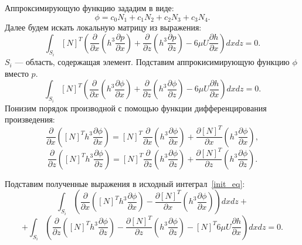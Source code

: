 \documentclass[a4paper,14pt]{extarticle}
\begin{document}
\noindent
Аппроксимирующую функцию зададим в виде:
\begin{equation*}
	\phi = c_0 N_1 + c_1 N_2 + c_2 N_3 + c_3 N_4.
\end{equation*}
\noindent
Далее будем искать локальную матрицу из выражения:
\begin{equation}
	\label{init_eq}
	\int_{S_i} {[N]^T \left(\frac{\partial}{\partial x} \left(h^3 \frac{\partial p}{\partial x} \right) + \frac{\partial}{\partial z} \left(h^3 \frac{\partial p}{\partial z} \right) - 6 \mu U \frac{\partial h}{\partial x}\right) dx dz} = 0.
\end{equation}
$S_i$ --- область, содержащая элемент. 
Подставим аппрокисимирующую функцию $\phi$ вместо $p$.
\begin{equation*}
	\int_{S_i} {[N]^T \left(\frac{\partial}{\partial x} \left(h^3 \frac{\partial \phi}{\partial x} \right) + \frac{\partial}{\partial z} \left(h^3 \frac{\partial \phi}{\partial z} \right) - 6 \mu U \frac{\partial h}{\partial x}\right) dx dz} = 0.
\end{equation*}
Понизим порядок производной с помощью функции дифференцирования произведения:
\begin{equation*}
	 \frac{\partial}{\partial x} \left( [N]^T h^3 \frac{\partial \phi}{\partial x} \right)  = [N]^T \frac{\partial}{\partial x} \left(h^3 \frac{\partial \phi}{\partial x} \right) + \frac{\partial[N]^T}{\partial x} \left(h^3 \frac{\partial \phi}{\partial x} \right),
\end{equation*}
\begin{equation*}
	 \frac{\partial}{\partial z} \left( [N]^T h^3 \frac{\partial \phi}{\partial z} \right)  = [N]^T \frac{\partial}{\partial z} \left(h^3 \frac{\partial \phi}{\partial z} \right) + \frac{\partial[N]^T}{\partial z} \left(h^3 \frac{\partial \phi}{\partial z} \right).
\end{equation*}

Подставим полученные выражения в исходный интеграл~\eqref{init_eq}:
\begin{equation*}
\int_{S_i} {\left(\frac{\partial}{\partial x} \left( [N]^T h^3 \frac{\partial \phi}{\partial x} \right) - \frac{\partial[N]^T}{\partial x} \left(h^3 \frac{\partial \phi}{\partial x} \right) \right) dxdz} + 
\end{equation*}
\begin{equation*}
 + \int_{S_i} {\left(\frac{\partial}{\partial z} \left( [N]^T h^3 \frac{\partial \phi}{\partial z} \right) - \frac{\partial[N]^T}{\partial z} \left(h^3 \frac{\partial \phi}{\partial z} \right) - [N]^T 6 \mu U \frac{\partial h}{\partial x}\right) dxdz} = 0.
\end{equation*}
\end{document}

